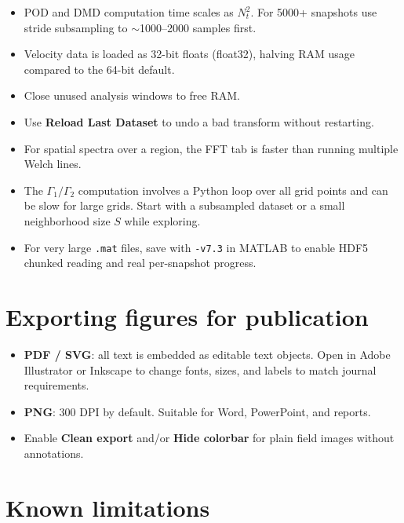 \documentclass[11pt, a4paper]{report}
\newcommand{\uipth}[1]{\textbf{\textcolor{upblue}{#1}}}
\begin{document}
\begin{itemize}[leftmargin=1.5em]
  \item POD and DMD computation time scales as $N_t^2$. For 5000+ snapshots use stride subsampling to $\sim$1000--2000 samples first.
  \item Velocity data is loaded as 32-bit floats (float32), halving RAM usage compared to the 64-bit default.
  \item Close unused analysis windows to free RAM.
  \item Use \uipth{Reload Last Dataset} to undo a bad transform without restarting.
  \item For spatial spectra over a region, the FFT tab is faster than running multiple Welch lines.
  \item The $\Gamma_1/\Gamma_2$ computation involves a Python loop over all grid points and can be slow for large grids. Start with a subsampled dataset or a small neighborhood size $S$ while exploring.
  \item For very large \texttt{.mat} files, save with \texttt{-v7.3} in MATLAB to enable HDF5 chunked reading and real per-snapshot progress.
\end{itemize}

\section{Exporting figures for publication}

\begin{itemize}[leftmargin=1.5em]
  \item \textbf{PDF / SVG}: all text is embedded as editable text objects. Open in Adobe Illustrator or Inkscape to change fonts, sizes, and labels to match journal requirements.
  \item \textbf{PNG}: 300 DPI by default. Suitable for Word, PowerPoint, and reports.
  \item Enable \uipth{Clean export} and/or \uipth{Hide colorbar} for plain field images without annotations.
\end{itemize}

\section{Known limitations}
\end{document}

